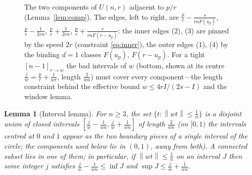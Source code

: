\documentclass[11pt]{article}
\newtheorem{lemma}[theorem]{Lemma}
\theoremstyle{definition}
\newcommand{\norm}[1]{\left\lVert #1 \right\rVert}
\begin{document}
\begin{figure}[t]
\centering
{}
\caption{The two components of $U(n,r)$ adjacent to $p/r$
(Lemma~\ref{lem:comp}).  The edges, left to right, are
$\frac pr-\frac{s}{rnF(u_p)}$, $\frac pr-\frac1{2rn}$,
$\frac pr+\frac1{2rn}$, $\frac pr+\frac{s}{rnF(r-u_p)}$: the inner edges
(2), (3) are pinned by the speed $2r$ (constraint \eqref{eq:inner}), the
outer edges (1), (4) by the binding $d=1$ classes $F(u_p)$, $F(r-u_p)$.
For a tight $[n-1]_{r\to w}$ the bad intervals of $w$ (bottom, shown at
its centre $\frac jw=\frac pr+\frac1{wr}$, length $\frac2{wn}$) must
cover every component---the length constraint behind the effective bound
$w\le4rI/(2s-I)$ and the window lemma.}
\label{fig:components}
\end{figure}

\begin{lemma}[Interval lemma]\label{lem:int}
For $n\ge3$, the set $\{t:\norm{wt}\le\frac1n\}$ is a disjoint union of
closed intervals $[\frac jw-\frac1{wn},\frac jw+\frac1{wn}]$ of length
$\frac2{wn}$ (on $[0,1)$ the intervals centred at $0$ and $1$ appear as
the two boundary pieces of a single interval of the circle; the
components used below lie in $(0,1)$, away from both). A connected subset lies in one of them; in particular, if
$\norm{wt}\le\frac1n$ on an interval $J$ then some integer $j$ satisfies
$\frac jw-\frac1{wn}\le\inf J$ and $\sup J\le\frac jw+\frac1{wn}$.
\end{lemma}
\end{document}
